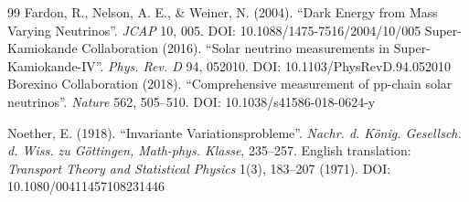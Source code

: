 \documentclass[a4paper,12pt]{article}
\begin{document}
\begin{thebibliography}{99}
 Fardon, R., Nelson, A. E., \& Weiner, N. (2004). ``Dark Energy from Mass Varying Neutrinos''. \textit{JCAP} 10, 005. DOI: 10.1088/1475-7516/2004/10/005
 Super-Kamiokande Collaboration (2016). ``Solar neutrino measurements in Super-Kamiokande-IV''. \textit{Phys. Rev. D} 94, 052010. DOI: 10.1103/PhysRevD.94.052010
 Borexino Collaboration (2018). ``Comprehensive measurement of pp-chain solar neutrinos''. \textit{Nature} 562, 505--510. DOI: 10.1038/s41586-018-0624-y

 Noether, E. (1918). ``Invariante Variationsprobleme''. \textit{Nachr. d. König. Gesellsch. d. Wiss. zu Göttingen, Math-phys. Klasse}, 235--257. English translation: \textit{Transport Theory and Statistical Physics} 1(3), 183--207 (1971). DOI: 10.1080/00411457108231446

\end{thebibliography}
\end{document}
